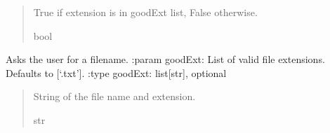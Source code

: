 \documentclass[letterpaper,10pt,english]{sphinxmanual}
\begin{document}
\begin{fulllineitems}
\begin{fulllineitems}
\begin{quote}
\begin{description}
\begin{itemize}
\end{itemize}

\sphinxAtStartPar
True if extension is in goodExt list, False otherwise.

\sphinxAtStartPar
bool

\end{description}\end{quote}

\end{fulllineitems}


\begin{fulllineitems}
\label{\detokenize{Setup.Inputs:Setup.Inputs.GetUserInput.UserInput.GetFileName}}
\pysigstartsignatures
{}
\pysigstopsignatures
\sphinxAtStartPar
Asks the user for a filename.
:param goodExt: List of valid file extensions. Defaults to {[}‘.txt’{]}.
:type goodExt: list{[}str{]}, optional
\begin{quote}\begin{description}
\sphinxAtStartPar
String of the file name and extension.

\sphinxAtStartPar
str

\end{description}\end{quote}

\end{fulllineitems}



\end{fulllineitems}
\end{document}
